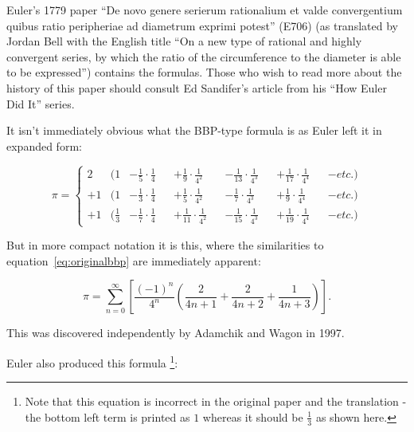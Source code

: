 \documentclass[11pt]{article}
\begin{document}
Euler's 1779 paper ``De novo genere serierum rationalium et valde convergentium quibus ratio peripheriae ad diametrum exprimi potest'' \cite{E706latin} (E706) 
(as translated by Jordan Bell with the English title ``On a new type of rational and highly convergent series, by which the ratio of the circumference to the diameter is able to be expressed'') contains the formulas. Those who wish to read more about the history of this paper should consult Ed Sandifer's article \cite{Sandifer} from his ``How Euler Did It'' series.

It isn't immediately obvious what the BBP-type formula is as Euler left it in expanded form:

\begin{equation*}
  \pi = \left \{
  \begin{aligned}
     2  &( 1            &- \tfrac{1}{5}\cdot\tfrac{1}{4} &&+ \tfrac{1}{9}\cdot\tfrac{1}{4^2}  &&- \tfrac{1}{13}\cdot\tfrac{1}{4^3} &&+ \tfrac{1}{17}\cdot\tfrac{1}{4^4} &&- etc. ) \\
    + 1 &( 1            &- \tfrac{1}{3}\cdot\tfrac{1}{4} &&+ \tfrac{1}{5}\cdot\tfrac{1}{4^2}  &&- \tfrac{1}{7}\cdot\tfrac{1}{4^3}  &&+ \tfrac{1}{9}\cdot\tfrac{1}{4^4}  &&- etc. ) \\
    + 1 &( \tfrac{1}{3} &- \tfrac{1}{7}\cdot\tfrac{1}{4} &&+ \tfrac{1}{11}\cdot\tfrac{1}{4^2} &&- \tfrac{1}{15}\cdot\tfrac{1}{4^3} &&+ \tfrac{1}{19}\cdot\tfrac{1}{4^4} &&- etc. )
  \end{aligned}
  \right.
\end{equation*}

But in more compact notation it is this, where the similarities to equation~\eqref{eq:originalbbp} are immediately apparent:

\begin{equation}  \label{eq:eulerbbp}
  \pi = \sum_{n = 0}^\infty \left[ \frac{(-1)^n}{4^n} \left( \frac{2}{4n + 1} + \frac{2}{4n + 2} + \frac{1}{4n + 3} \right) \right].
\end{equation}

This was discovered independently by Adamchik and Wagon \cite{Adamchik_Wagon_1997} in 1997.

Euler also produced this formula \footnote{Note that this equation is incorrect in the original paper and the translation - the bottom left term is printed as $1$ whereas it should be $\frac{1}{3}$ as shown here.}:

\nopagebreak
\end{document}
